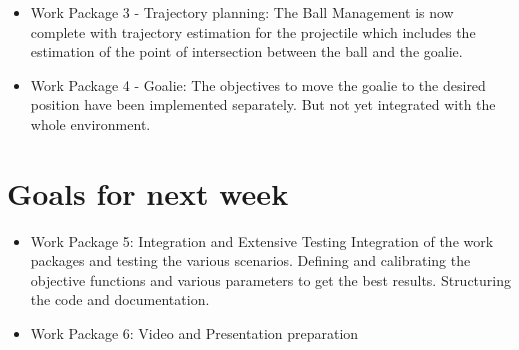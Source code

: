 \documentclass[12pt,pdftex,a4paper]{article}
\begin{document}
\begin{itemize}
\item
Work Package 3 - Trajectory planning:
The Ball Management is now complete with trajectory estimation for the projectile which includes the estimation of the point of intersection between the ball and the goalie.
\\
\begin{enumerate}
    \begin{minipage}{\linewidth}
        \centering
    \end{minipage}
\end{enumerate}

\item
Work Package 4 - Goalie:
The objectives to move the goalie to the desired position have been implemented separately. But not yet integrated with the whole environment.
\end{itemize}

\section*{Goals for next week}
\begin{itemize}
\item
Work Package 5: Integration and Extensive Testing
Integration of the work packages and testing the various scenarios. Defining and calibrating the objective functions and various parameters to get the best results. Structuring the code and documentation. 
\item
Work Package 6: Video and Presentation preparation\end{itemize}

\end{document}
